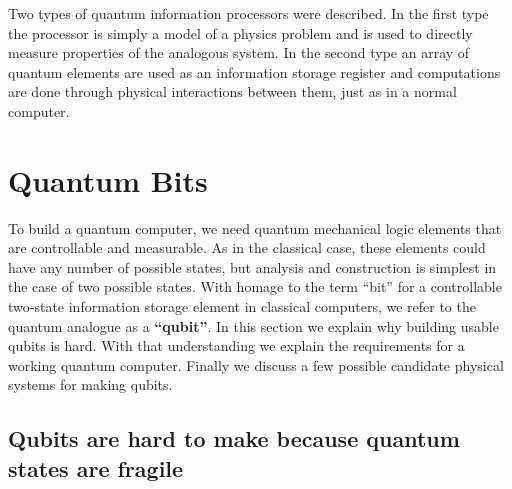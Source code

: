 Two types of quantum information processors were described. In the first type the processor is simply a model of a physics problem and is used to directly measure properties of the analogous system. In the second type an array of quantum elements are used as an information storage register and computations are done through physical interactions between them, just as in a normal computer.

\section{Quantum Bits}

To build a quantum computer, we need quantum mechanical logic elements that are controllable and measurable. As in the classical case, these elements could have any number of possible states, but analysis and construction is simplest in the case of two possible states. With homage to the term ``bit'' for a controllable two-state information storage element in classical computers, we refer to the quantum analogue as a \textbf{``qubit''}. In this section we explain why building usable qubits is hard. With that understanding we explain the requirements for a working quantum computer. Finally we discuss a few possible candidate physical systems for making qubits.

\subsection{Qubits are hard to make because quantum states are fragile} \label{sec:ch:introduction:coherence}

